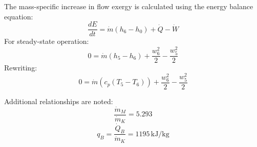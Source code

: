 The mass-specific increase in flow exergy is calculated using the energy balance equation:  
\[
\frac{dE}{dt} = \dot{m} \left( h_6 - h_0 \right) + \dot{Q} - \dot{W}
\]  
For steady-state operation:  
\[
0 = \dot{m} \left( h_5 - h_6 \right) + \frac{w_6^2}{2} - \frac{w_5^2}{2}
\]  
Rewriting:  
\[
0 = \dot{m} \left( c_p (T_5 - T_6) \right) + \frac{w_6^2}{2} - \frac{w_5^2}{2}
\]  

Additional relationships are noted:  
\[
\frac{\dot{m}_M}{\dot{m}_K} = 5.293
\]  
\[
q_B = \frac{\dot{Q}_B}{\dot{m}_K} = 1195 \, \text{kJ/kg}
\]
